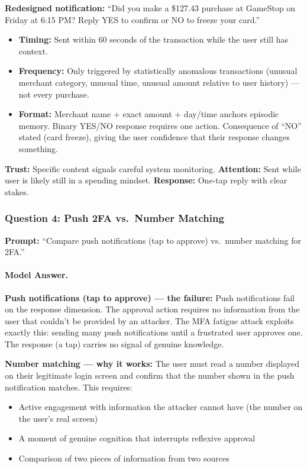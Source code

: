 \textbf{Redesigned notification:} ``Did you make a \$127.43 purchase at GameStop on Friday at 6:15 PM? Reply YES to confirm or NO to freeze your card.''

\begin{itemize}
    \item \textbf{Timing:} Sent within 60 seconds of the transaction while the user still has context.
    \item \textbf{Frequency:} Only triggered by statistically anomalous transactions (unusual merchant category, unusual time, unusual amount relative to user history) --- not every purchase.
    \item \textbf{Format:} Merchant name + exact amount + day/time anchors episodic memory. Binary YES/NO response requires one action. Consequence of ``NO'' stated (card freeze), giving the user confidence that their response changes something.
\end{itemize}

\textbf{Trust:} Specific content signals careful system monitoring. \textbf{Attention:} Sent while user is likely still in a spending mindset. \textbf{Response:} One-tap reply with clear stakes.

\subsubsection{Question 4: Push 2FA vs.\ Number Matching}

\textbf{Prompt:} ``Compare push notifications (tap to approve) vs.\ number matching for 2FA.''

\paragraph{Model Answer.}

\textbf{Push notifications (tap to approve) --- the failure:}
Push notifications fail on the response dimension. The approval action requires no information from the user that couldn't be provided by an attacker. The MFA fatigue attack exploits exactly this: sending many push notifications until a frustrated user approves one. The response (a tap) carries no signal of genuine knowledge.

\textbf{Number matching --- why it works:}
The user must read a number displayed on their legitimate login screen and confirm that the number shown in the push notification matches. This requires:
\begin{itemize}
    \item Active engagement with information the attacker cannot have (the number on the user's real screen)
    \item A moment of genuine cognition that interrupts reflexive approval
    \item Comparison of two pieces of information from two sources
\end{itemize}

